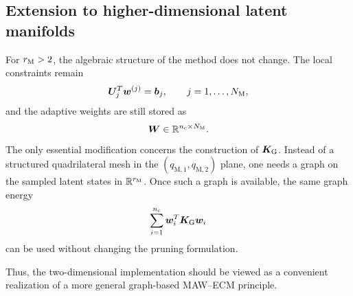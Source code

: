 \documentclass[11pt,a4paper]{article}
\begin{document}
\subsection{Extension to higher-dimensional latent manifolds}

For $r_{\mathrm{M}}>2$, the algebraic structure of the method does not change. The local
constraints remain
\[
        \bm U_j^T\bm w^{(j)}=\bm b_j,
        \qquad
        j=1,\ldots,N_{\mathrm{M}},
\]
and the adaptive weights are still stored as
\[
        \bm W\in\mathbb{R}^{n_{\mathrm{c}}\times N_{\mathrm{M}}}.
\]
The only essential modification concerns the construction of $\bm K_{\mathrm{G}}$.
Instead of a structured quadrilateral mesh in the $(q_{\mathrm{M},1},
q_{\mathrm{M},2})$ plane, one needs a graph on the sampled latent states in
$\mathbb{R}^{r_{\mathrm{M}}}$. Once such a graph is available, the same graph energy
\[
        \sum_{i=1}^{n_{\mathrm{c}}}\bm w_i^T\bm K_{\mathrm{G}}\bm w_i
\]
can be used without changing the pruning formulation.

Thus, the two-dimensional implementation should be viewed as a convenient
realization of a more general graph-based MAW--ECM principle.

%
\end{document}
